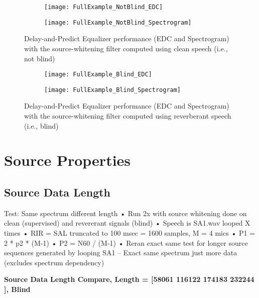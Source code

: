 \begin{figure}[H]
	\centering
	\begin{subfigure}[b]{0.38\textwidth}
		\centering
		\texttt{[image: FullExample\_NotBlind\_EDC]}
	\end{subfigure}
	\begin{subfigure}[b]{0.49\textwidth}
		\centering
		\texttt{[image: FullExample\_NotBlind\_Spectrogram]}
	\end{subfigure}
	\caption{Delay-and-Predict Equalizer performance (EDC and Spectrogram) with the source-whitening filter computed using clean speech (i.e., not blind)}
	\label{fig:fullExample_NotBlind}
\end{figure}


\begin{figure}[H]
	\centering
	\begin{subfigure}[b]{0.38\textwidth}
		\centering
		\texttt{[image: FullExample\_Blind\_EDC]}
	\end{subfigure}
	\begin{subfigure}[b]{0.49\textwidth}
		\centering
		\texttt{[image: FullExample\_Blind\_Spectrogram]}
	\end{subfigure}
	\caption{Delay-and-Predict Equalizer performance (EDC and Spectrogram) with the source-whitening filter computed using reverberant speech (i.e., blind)}
	\label{fig:fullExample_Blind}
\end{figure}




\section{Source Properties}


\subsection{Source Data Length}

Test: Same spectrum different length
•	Run 2x with source whitening done on clean (supervised) and revererant signals (blind)
•	Speech is SA1.wav looped X times
•	RIR = SAL truncated to 100 msec = 1600 samples, M = 4 mics
•	P1 = 2 * p2 * (M-1)
•	P2 = N60 / (M-1)
•	Reran exact same test for longer source sequences generated by looping SA1 – Exact same spectrum just more data (excludes spectrum dependency)

\textbf{Source Data Length Compare, Length = [58061  116122 174183 232244 ], Blind}


